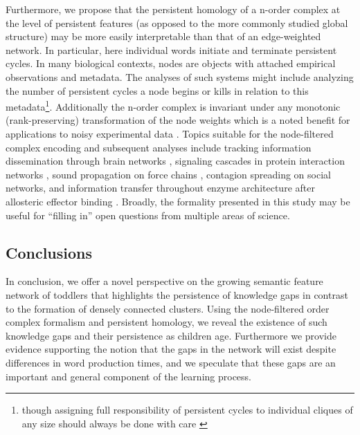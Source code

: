 \documentclass{article}
\begin{document}
Furthermore, we propose that the persistent homology of a n-order complex at the level of persistent features (as opposed to the more commonly studied global structure) may be more easily interpretable than that of an edge-weighted network. In particular, here individual words initiate and terminate persistent cycles. In many biological contexts, nodes are objects with attached empirical observations and metadata. The analyses of such systems might include analyzing the number of persistent cycles a node begins or kills in relation to this metadata\footnote{though assigning full responsibility of persistent cycles to individual cliques of any size should always be done with care \cite{bendich2015stabilizing}}. Additionally the n-order complex is invariant under any monotonic (rank-preserving) transformation of the node weights which is a noted benefit for applications to noisy experimental data \cite{giusti2015clique,petri2013topological}. Topics suitable for the node-filtered complex encoding and subsequent analyses include tracking information dissemination through brain networks \cite{mivsic2015cooperative}, signaling cascades in protein interaction networks \cite{vinayagam2011directed}, sound propagation on force chains \cite{bassett2012influence}, contagion spreading on social networks, and information transfer throughout enzyme architecture after allosteric effector binding \cite{cockrell2013new}. Broadly, the formality presented in this study may be useful for ``filling in'' open questions from multiple areas of science.



\subsection*{Conclusions}

In conclusion, we offer a novel perspective on the growing semantic feature network of toddlers that highlights the persistence of knowledge gaps in contrast to the formation of densely connected clusters. Using the node-filtered order complex formalism and persistent homology, we reveal the existence of such knowledge gaps and their persistence as children age. Furthermore we provide evidence supporting the notion that the gaps in the network will exist despite differences in word production times, and we speculate that these gaps are an important and general component of the learning process.
\end{document}
